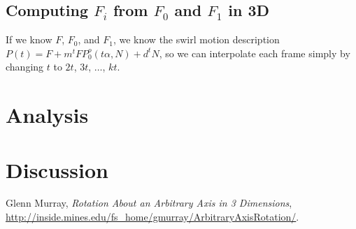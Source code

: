\documentclass[twoside,11pt]{article}
\begin{document}
\subsection{Computing $F_i$ from $F_0$ and $F_1$ in 3D}
If we know $F$, $F_0$, and $F_1$, we know the swirl motion description $P(t) = F + m^t FP_0^o(t\alpha, N) + d^t N$, so we can interpolate each frame simply by changing $t$ to $2t$, $3t$, $\ldots$, $kt$.

\section{Analysis}


\section{Discussion}






\begin{thebibliography}{9}
  Glenn Murray,
  \emph{Rotation About an Arbitrary Axis in 3 Dimensions},
  \url{http://inside.mines.edu/fs_home/gmurray/ArbitraryAxisRotation/}.

\end{thebibliography}
\end{document}
